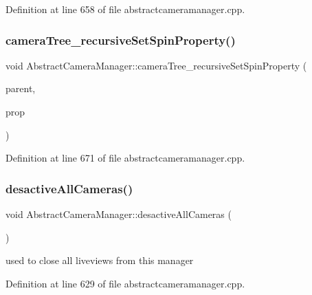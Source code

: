 Definition at line 658 of file abstractcameramanager.\+cpp.

\mbox{\label{class_abstract_camera_manager_a28adef627215413716f8a301330055c9}} 
\subsubsection{\texorpdfstring{cameraTree\_recursiveSetSpinProperty()}{cameraTree\_recursiveSetSpinProperty()}}
{\footnotesize\ttfamily void Abstract\+Camera\+Manager\+::camera\+Tree\+\_\+recursive\+Set\+Spin\+Property (\begin{DoxyParamCaption}\item[{Q\+Standard\+Item $\ast$}]{parent,  }\item[{\mbox{\hyperlink{class_camera_manager_spin_1_1_spin_camera_property}{Camera\+Manager\+Spin\+::\+Spin\+Camera\+Property}} $\ast$}]{prop }\end{DoxyParamCaption})\hspace{0.3cm}{\ttfamily [protected]}}



Definition at line 671 of file abstractcameramanager.\+cpp.

\mbox{\label{class_abstract_camera_manager_a92ed218ecaab3f6a75d3d24e5544d17f}} 
\subsubsection{\texorpdfstring{desactiveAllCameras()}{desactiveAllCameras()}}
{\footnotesize\ttfamily void Abstract\+Camera\+Manager\+::desactive\+All\+Cameras (\begin{DoxyParamCaption}{ }\end{DoxyParamCaption})}



used to close all liveviews from this manager 



Definition at line 629 of file abstractcameramanager.\+cpp.

